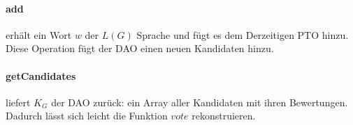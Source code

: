 \documentclass[a4paper,12pt]{report}
\begin{document}
\paragraph*{add}
erhält ein Wort $w$ der $L(G)$ Sprache und fügt es dem Derzeitigen PTO hinzu. Diese Operation fügt der DAO einen neuen Kandidaten hinzu.

\paragraph*{getCandidates}
liefert $K_G$ der DAO zurück: ein Array aller Kandidaten mit ihren Bewertungen. Dadurch lässt sich leicht die Funktion $vote$ rekonstruieren.




\end{document}
